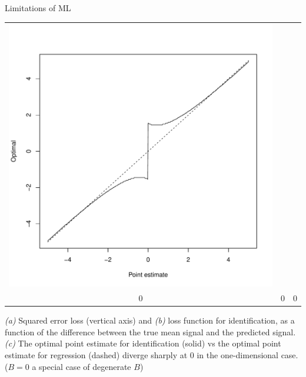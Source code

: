 \documentclass[final]{beamer}
\newlength{\onecolwid}
\begin{document}
\begin{frame}[t]
\begin{columns}[t]
\begin{column}{\onecolwid}
\begin{block}{Limitations of ML}
\begin{center}
\begin{tabular}{ccc}
\includegraphics[scale = 0.5, trim = 1in 1in 0.5in 1in, clip]{zero2.pdf}\\
{\small 0} & {\small 0} & {\small 0}\\
\end{tabular}
\end{center}
{\small
\emph{(a)} Squared error loss (vertical axis) and \emph{(b)} loss function for identification,
as a function of the difference between the true mean signal and the predicted signal.\\
\emph{(c)} The optimal point estimate for identification (solid) vs the optimal point estimate for regression (dashed)
diverge sharply at 0 in the one-dimensional case.  ($B = 0$ a special case of degenerate $B$)
}
\end{block}






\end{column}
\end{columns}
\end{frame}
\end{document}

